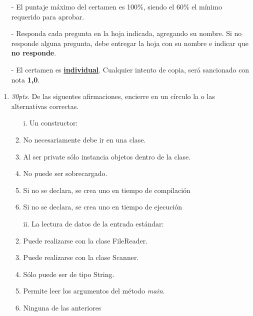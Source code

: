 \documentclass[10pt]{article}
\begin{document}
	{\scriptsize
	\begin{itemize}
		\item[-] El puntaje m\'aximo del certamen es 100\%, siendo el 60\% el m\'inimo requerido para aprobar.
		\item[-] Responda cada pregunta en la hoja indicada, agregando su nombre. Si no responde alguna pregunta, debe entregar la hoja con su nombre e indicar que \textbf{no responde}.
		\item[-] El certamen es \underline{\textbf{individual}}. Cualquier intento de copia, ser\'a sancionado con nota \textbf{1,0}.
	\end{itemize}
	
	\vspace*{-20pt}

	\begin{enumerate}

		\item \emph{30pts.} De las siguentes afirmaciones, encierre en un c\'irculo la o las alternativas correctas.
		
		\begin{multicols}{2}

			\begin{enumerate}[label=(\alph*)]
				\item[i.] Un constructor:
				\item No necesariamente debe ir en una clase.
				\item Al ser private s\'olo instancia objetos dentro de la clase.
				\item No puede ser sobrecargado.
				\item Si no se declara, se crea uno en tiempo de compilaci\'on
				\item Si no se declara, se crea uno en tiempo de ejecuci\'on
			\end{enumerate}

			\begin{enumerate}[label=(\alph*)]
				\item[ii.] La lectura de datos de la entrada est\'andar:
				\item Puede realizarse con la clase FileReader.
				\item Puede realizarse con la clase Scanner.
				\item S\'olo puede ser de tipo String.
				\item Permite leer los argumentos del m\'etodo \emph{main}.
				\item Ninguna de las anteriores
			\end{enumerate}


\end{multicols}
\end{enumerate}}
\end{document}
